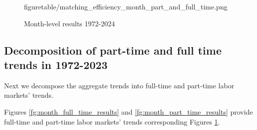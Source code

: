 \documentclass[12pt]{article}
\begin{document}
\begin{figure}[!ht]
\begin{center}
{  {figuretable/matching_efficiency_month_part_and_full_time.png}}
  \\
  \caption{Month-level results 1972-2024}
  \label{fg:month_part_and_full_time_results} 
  \end{center}
  \footnotesize
\end{figure} 




\subsection{Decomposition of part-time and full time trends in 1972-2023}
Next we decompose the aggregate trends into full-time and part-time labor markets' trends.


Figures \ref{fg:month_full_time_results} and \ref{fg:month_part_time_results} provide full-time and part-time labor markets' trends corresponding Figures \ref{fg:month_part_and_full_time_results}.
\end{document}
